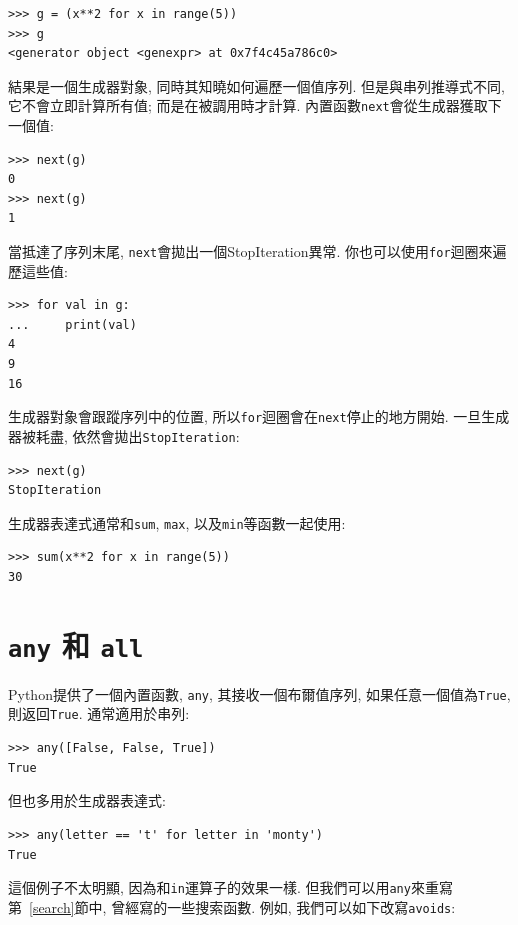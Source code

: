 \documentclass[10pt]{book}
\begin{document}
\begin{verbatim}
>>> g = (x**2 for x in range(5))
>>> g
<generator object <genexpr> at 0x7f4c45a786c0>
\end{verbatim}
%
結果是一個生成器對象, 同時其知曉如何遍歷一個值序列. 
但是與串列推導式不同, 它不會立即計算所有值; 而是在被調用時才計算. 
內置函數{\tt next}會從生成器獲取下一個值:

\begin{verbatim}
>>> next(g)
0
>>> next(g)
1
\end{verbatim}
%
當抵達了序列末尾, {\tt next}會拋出一個StopIteration異常. 
你也可以使用{\tt for}迴圈來遍歷這些值:

\begin{verbatim}
>>> for val in g:
...     print(val)
4
9
16
\end{verbatim}
%
生成器對象會跟蹤序列中的位置, 
所以{\tt for}迴圈會在{\tt next}停止的地方開始. 
一旦生成器被耗盡, 依然會拋出{\tt StopIteration}:

\begin{verbatim}
>>> next(g)
StopIteration
\end{verbatim}

生成器表達式通常和{\tt sum},
{\tt max}, 以及{\tt min}等函數一起使用:

\begin{verbatim}
>>> sum(x**2 for x in range(5))
30
\end{verbatim}


\section{{\tt any} 和 {\tt all}}

Python提供了一個內置函數, {\tt any}, 其接收一個布爾值序列, 
如果任意一個值為{\tt True}, 則返回{\tt True}. 通常適用於串列:

\begin{verbatim}
>>> any([False, False, True])
True
\end{verbatim}
%
但也多用於生成器表達式:

\begin{verbatim}
>>> any(letter == 't' for letter in 'monty')
True
\end{verbatim}
%
這個例子不太明顯, 因為和{\tt in}運算子的效果一樣. 
但我們可以用{\tt any}來重寫第~\ref{search}節中, 曾經寫的一些搜索函數. 
例如, 我們可以如下改寫{\tt avoids}:
\end{document}
